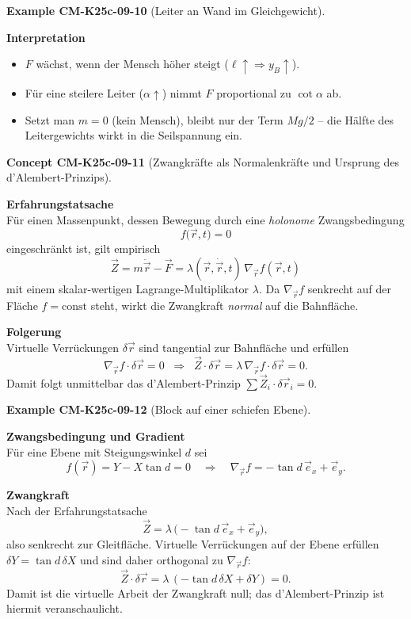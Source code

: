 \documentclass[10pt, letterpaper]{article}
\newcommand{\CustomHeading}[3]{%
  \par\medskip\noindent%
  \textbf{#1 #2} \textnormal{(#3)}.\enskip%
}
\newenvironment{EXA}[2]{\CustomHeading{Example}{#1}{#2}}{}
\newenvironment{CONC}[2]{\CustomHeading{Concept}{#1}{#2}}{}
\begin{document}
\begin{EXA}{CM-K25c-09-10}{Leiter an Wand im Gleichgewicht}
\textbf{Interpretation}

\begin{itemize}
\item $F$ wächst, wenn der Mensch höher steigt
      ($\ell\!\uparrow\Rightarrow y_B\uparrow$).
\item Für eine steilere Leiter ($\alpha\!\uparrow$)
      nimmt $F$ proportional zu $\cot\alpha$ ab.
\item Setzt man $m=0$ (kein Mensch), bleibt nur der Term
      $Mg/2$ – die Hälfte des Leitergewichts wirkt in die Seil­spannung
      ein.
\end{itemize}
\end{EXA}

\begin{CONC}{CM-K25c-09-11}{Zwangkräfte als Normalenkräfte und Ursprung des d’Alembert-Prinzips}
\textbf{Erfahrungstatsache}\\
Für einen Massenpunkt, dessen Bewegung durch eine \emph{holonome}
Zwangsbedingung
\[
  f\!\bigl(\vec r,t\bigr)=0
\]
eingeschränkt ist, gilt empirisch
\[
  \boxed{\;
    \vec Z = m\ddot{\vec r}-\vec F
    = \lambda(\vec r,\dot{\vec r},t)\,
      \nabla_{\!\vec r} f(\vec r,t)
  \;}
\]
mit einem skalar-wertigen Lagrange-Multiplikator $\lambda$.  
Da $\nabla_{\!\vec r}f$ senkrecht auf der Fläche $f=\text{const}$
steht, wirkt die Zwangkraft \emph{normal} auf die Bahnfläche.

\textbf{Folgerung}\\
Virtuelle Verrückungen $\delta\vec r$ sind tangential zur
Bahnfläche und erfüllen
\[
  \nabla_{\!\vec r} f\!\cdot\!\delta\vec r = 0
  \;\;\Longrightarrow\;\;
  \vec Z\!\cdot\!\delta\vec r
  = \lambda\,\nabla_{\!\vec r}f\!\cdot\!\delta\vec r = 0 .
\]
Damit folgt unmittelbar das d’Alembert-Prinzip
$\sum\vec Z_i\!\cdot\!\delta\vec r_i = 0$.
\end{CONC}

\begin{EXA}{CM-K25c-09-12}{Block auf einer schiefen Ebene}
\textbf{Zwangsbedingung und Gradient}\\
Für eine Ebene mit Steigungswinkel $d$ sei
\[
  f(\vec r) = Y - X\tan d = 0
  \quad\Longrightarrow\quad
  \nabla_{\!\vec r}f
  = -\tan d\,\vec e_x + \vec e_y .
\]

\textbf{Zwangkraft}\\
Nach der Erfahrungstatsache
\[
  \vec Z
  = \lambda\,\bigl(-\tan d\,\vec e_x + \vec e_y\bigr),
\]
also senkrecht zur Gleitfläche.  
Virtuelle Verrückungen auf der Ebene erfüllen
$\delta Y = \tan d\,\delta X$ und sind daher orthogonal zu
$\nabla_{\!\vec r}f$:
\[
  \vec Z\!\cdot\!\delta\vec r
  = \lambda\,(-\tan d\,\delta X + \delta Y) = 0 .
\]
Damit ist die virtuelle Arbeit der Zwangkraft null; 
das d’Alembert-Prinzip ist hiermit veranschaulicht.
\end{EXA}
\end{document}
